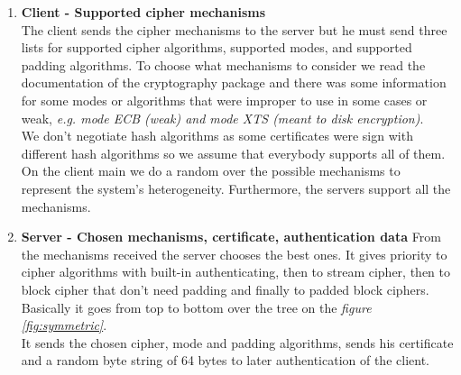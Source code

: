 \documentclass[12pt]{article}
\begin{document}
\begin{enumerate}[label=\textbf{\arabic*}]
  \item \textbf{Client - Supported cipher mechanisms} \\
    The client sends the cipher mechanisms to the server but he must send three lists for supported cipher algorithms, 
      supported modes, and supported padding algorithms. To choose what mechanisms to consider we
      read the documentation of the cryptography package and there was some information for some modes or
      algorithms that were improper to use in some cases or weak, \textit{e.g. mode ECB (weak) and
      mode XTS (meant to disk encryption)}. \\ 
    We don't negotiate hash algorithms as some certificates
      were sign with different hash algorithms so we assume that everybody supports all of them.\\
      On the client main we do a random over the possible
      mechanisms to represent the system's heterogeneity. Furthermore, the servers support all the mechanisms.

  \item \textbf{Server - Chosen mechanisms, certificate, authentication data}
    From the mechanisms received  the server chooses the best ones. It gives priority to cipher algorithms with
      built-in authenticating, then to stream cipher, then to block cipher that don't need padding and 
      finally to padded block ciphers. Basically it goes from top to bottom over the tree on the 
      \textit{figure \ref{fig:symmetric}}. \\
    It sends the chosen cipher, mode and padding algorithms, sends his certificate and a random byte string 
      of 64 bytes to later authentication of the client.


\end{enumerate}
\end{document}

